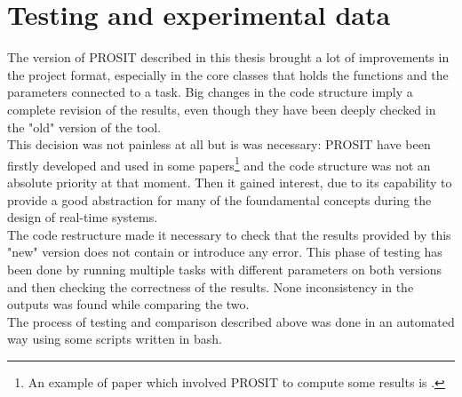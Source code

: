 \chapter{Testing and experimental data}\label{chp:experiments}


The version of PROSIT described in this thesis brought a lot of improvements in the project format, especially in the core classes that holds the functions and the parameters connected to a task. Big changes in the code structure imply a complete revision of the results, even though they have been deeply checked in the "old" version of the tool.\\
This decision was not painless at all but is was necessary: PROSIT have been firstly developed and used in some papers\footnote{An example of paper which involved PROSIT to compute some results is \cite{probGuarantees}.} and the code structure was not an absolute priority at that moment. Then it gained interest, due to its capability to provide a good abstraction for many of the foundamental concepts during the design of real-time systems.\\
The code restructure made it necessary to check that the results provided by this "new" version does not contain or introduce any error. This phase of testing has been done by running multiple tasks with different parameters on both versions and then checking the correctness of the results. None inconsistency in the outputs was found while comparing the two.\\
The process of testing and comparison described above was done in an automated way using some scripts written in bash.

